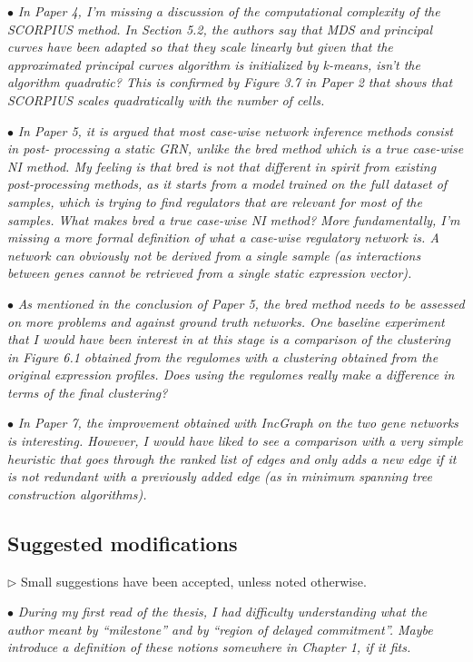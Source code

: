 \documentclass[10pt]{article}
\newcommand{\exam}[2][\  ]{\hspace{0pt}\marginpar{\color{red}#1}$\bullet$ \textit{#2}}
\newcommand{\imp}[1]{{\color{red} #1}}
\newcommand{\answ}[1]{{\color{blue} $\triangleright$ #1}}
\newcommand{\bigexclaim}{\raisebox{-0.1em}{\BigTriangleUp}\hspace{-0.32em}\llap{\small\textbf{!}}\hspace{0.32em}}
\newcommand{\tagimp}{\bigexclaim}
\newcommand{\tagtime}{{\Large $\hourglass$}}
\begin{document}
{{\exam[\tagimp]{In Paper 4, \imp{I’m missing a discussion of the computational complexity of the SCORPIUS
	method.} In Section 5.2, the authors say that MDS and principal curves have been adapted so
	that they scale linearly but given that the approximated principal curves algorithm is
	initialized by k-means, isn’t the algorithm quadratic? This is confirmed by Figure 3.7 in
	Paper 2 that shows that SCORPIUS scales quadratically with the number of cells.}

\exam[\tagimp]{In Paper 5, it is argued that most case-wise network inference methods consist in post-
	processing a static GRN, unlike the bred method which is a true case-wise NI method. My
	feeling is that bred is not that different in spirit from existing post-processing methods, as it
	starts from a model trained on the full dataset of samples, which is trying to find regulators
	that are relevant for most of the samples. \imp{What makes bred a true case-wise NI method?}
	More fundamentally, \imp{I’m missing a more formal definition of what a case-wise regulatory
	network is.} A network can obviously not be derived from a single sample (as interactions
	between genes cannot be retrieved from a single static expression vector).}

\exam[\tagimp \tagtime]{As mentioned in the conclusion of Paper 5, the bred method needs to be assessed on more
	problems and against ground truth networks. One baseline experiment that I would have
	been interest in at this stage is \imp{a comparison of the clustering in Figure 6.1 obtained from
	the regulomes with a clustering obtained from the original expression profiles.} Does using
	the regulomes really make a difference in terms of the final clustering?}

\exam[\tagtime]{In Paper 7, the improvement obtained with IncGraph on the two gene networks is interesting.
	However, \imp{I would have liked to see a comparison with a very simple heuristic that goes
	through the ranked list of edges and only adds a new edge if it is not redundant with a
	previously added edge} (as in minimum spanning tree construction algorithms).}


\subsection{Suggested modifications}
\answ{Small suggestions have been accepted, unless noted otherwise.}

\exam{During my first read of the thesis, I had difficulty understanding what the author meant by
	“milestone” and by “region of delayed commitment”. Maybe introduce a definition of these
	notions somewhere in Chapter 1, if it fits.}

}}
\end{document}
